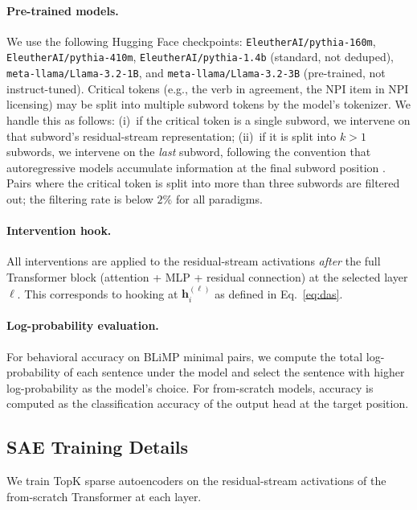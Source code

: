 \documentclass[11pt]{article}
\begin{document}
\paragraph{Pre-trained models.}
We use the following Hugging Face checkpoints: \texttt{EleutherAI/pythia-160m}, \texttt{EleutherAI/pythia-410m}, \texttt{EleutherAI/pythia-1.4b} (standard, not deduped), \texttt{meta-llama/Llama-3.2-1B}, and \texttt{meta-llama/Llama-3.2-3B} (pre-trained, not instruct-tuned).
Critical tokens (e.g., the verb in agreement, the NPI item in NPI licensing) may be split into multiple subword tokens by the model's tokenizer.
We handle this as follows: (i)~if the critical token is a single subword, we intervene on that subword's residual-stream representation; (ii)~if it is split into $k > 1$ subwords, we intervene on the \emph{last} subword, following the convention that autoregressive models accumulate information at the final subword position \citep{DBLP:conf/emnlp/HendelGG23}.
Pairs where the critical token is split into more than three subwords are filtered out; the filtering rate is below $2\%$ for all paradigms.

\paragraph{Intervention hook.}
All interventions are applied to the residual-stream activations \emph{after} the full Transformer block (attention + MLP + residual connection) at the selected layer $\ell$.
This corresponds to hooking at $\mathbf{h}_i^{(\ell)}$ as defined in Eq.~\ref{eq:das}.

\paragraph{Log-probability evaluation.}
For behavioral accuracy on BLiMP minimal pairs, we compute the total log-probability of each sentence under the model and select the sentence with higher log-probability as the model's choice.
For from-scratch models, accuracy is computed as the classification accuracy of the output head at the target position.

\subsection{SAE Training Details}
\label{app:sae-details}

We train TopK sparse autoencoders \citep{DBLP:conf/iclr/GaoTTGTRSL025} on the residual-stream activations of the from-scratch Transformer at each layer.
\end{document}
